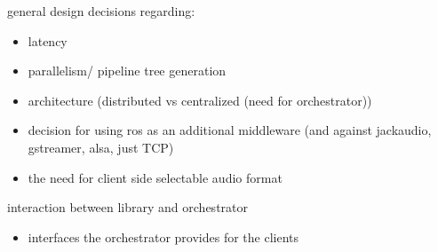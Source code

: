 general design decisions regarding:

\begin{itemize}
	\item latency
	\item parallelism/ pipeline tree generation
	\item architecture (distributed vs centralized (need for orchestrator))
	\item decision for using ros as an additional middleware (and against jackaudio, gstreamer, alsa, just TCP)
	\item the need for client side selectable audio format 
\end{itemize}

interaction between library and orchestrator

\begin{itemize}
	\item interfaces the orchestrator provides for the clients
\end{itemize}


